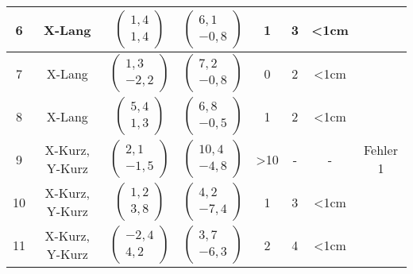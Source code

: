 \begin{appendix}
\begin{center}
\begin{longtable}{|c|c|c|c|c|c|c|c|}
    		\hline
    		6 & X-Lang &  $\left(\begin{array}{c} 1,4 \\ 1,4\end{array}\right)$ & $\left(\begin{array}{c} 6,1 \\ -0,8\end{array}\right)$ & 1& 3& <1cm& \checkmark\\
    		\hline
    		7 & X-Lang &  $\left(\begin{array}{c} 1,3 \\ -2,2\end{array}\right)$ & $\left(\begin{array}{c} 7,2 \\ -0,8\end{array}\right)$ & 0& 2& <1cm& \checkmark\\
    		\hline
    		8 & X-Lang &  $\left(\begin{array}{c} 5,4 \\ 1,3\end{array}\right)$ & $\left(\begin{array}{c} 6,8 \\ -0,5\end{array}\right)$ & 1& 2& <1cm& \checkmark\\
    		\hline
    		9 & X-Kurz, Y-Kurz &  $\left(\begin{array}{c} 2,1 \\ -1,5\end{array}\right)$ & $\left(\begin{array}{c} 10,4 \\ -4,8\end{array}\right)$ & >10& -& -& Fehler 1\\
    		\hline
    		10 & X-Kurz, Y-Kurz &  $\left(\begin{array}{c} 1,2 \\ 3,8\end{array}\right)$ & $\left(\begin{array}{c} 4,2 \\ -7,4\end{array}\right)$ & 1& 3& <1cm& \checkmark\\
    		\hline
    		11 & X-Kurz, Y-Kurz &  $\left(\begin{array}{c} -2,4 \\ 4,2\end{array}\right)$ & $\left(\begin{array}{c} 3,7 \\ -6,3\end{array}\right)$ & 2& 4& <1cm& \checkmark\\

\end{longtable}
\end{center}
\end{appendix}
